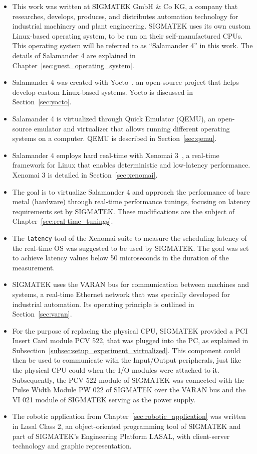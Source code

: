 \documentclass[MMR,Master,english]{style/twbook}
\begin{document}
\begin{itemize}
	\item This work was written at SIGMATEK GmbH \& Co KG, a company that researches, develops, produces, and distributes automation technology for industrial machinery and plant engineering. SIGMATEK uses its own custom Linux-based operating system, to be run on their self-manufactured CPUs. This operating system will be referred to as ``Salamander 4'' in this work. The details of Salamander 4 are explained in Chapter~\ref{sec:guest_operating_system}.
	\item Salamander 4 was created with Yocto~\cite{WelcomeYoctoProject}, an open-source project that helps develop custom Linux-based systems. Yocto is discussed in Section~\ref{sec:yocto}.
	\item Salamander 4 is virtualized through Quick Emulator (QEMU), an open-source emulator and virtualizer that allows running different operating systems on a computer. QEMU is described in Section~\ref{sec:qemu}.
	\item Salamander 4 employs hard real-time with Xenomai 3~\cite{XenomaiXenomai}, a real-time framework for Linux that enables deterministic and low-latency performance. Xenomai 3 is detailed in Section~\ref{sec:xenomai}.
	\item The goal is to virtualize Salamander 4 and approach the performance of bare metal (hardware) through real-time performance tunings, focusing on latency requirements set by SIGMATEK. These modifications are the subject of Chapter~\ref{sec:real-time_tunings}.
	\item The \texttt{latency} tool of the Xenomai suite to measure the scheduling latency of the real-time OS was suggested to be used by SIGMATEK. The goal was set to achieve latency values below 50 microseconds in the duration of the measurement.
	\item SIGMATEK uses the VARAN bus for communication between machines and systems, a real-time Ethernet network that was specially developed for industrial automation. Its operating principle is outlined in Section~\ref{sec:varan}.
	\item For the purpose of replacing the physical CPU, SIGMATEK provided a PCI Insert Card module PCV 522, that was plugged into the PC, as explained in Subsection~\ref{subsec:setup_experiment_virtualized}. This component could then be used to communicate with the Input/Output peripherals, just like the physical CPU could when the I/O modules were attached to it. Subsequently, the PCV 522 module of SIGMATEK was connected with the Pulse Width Module PW 022 of SIGMATEK over the VARAN bus and the VI 021 module of SIGMATEK serving as the power supply.
	\item The robotic application from Chapter~\ref{sec:robotic_application} was written in Lasal Class 2, an object-oriented programming tool of SIGMATEK and part of SIGMATEK's Engineering Platform LASAL, with client-server technology and graphic representation.
\end{itemize}
\end{document}
